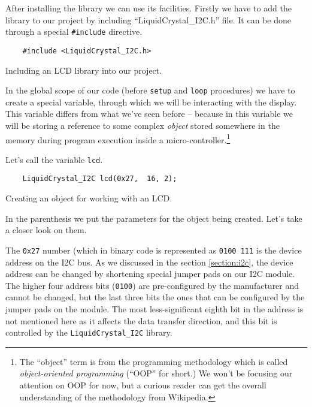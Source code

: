 \documentclass[../sparc.tex]{subfiles}
\begin{document}
After installing the library we can use its facilities.  Firstly we have to add
the library to our project by including ``LiquidCrystal\_I2C.h'' file.  It can
be done through a special \texttt{#include} directive.

\begin{listing}[ht]
  \begin{verbatim}
    #include <LiquidCrystal_I2C.h>
  \end{verbatim}
  \caption{Including an LCD library into our project.}
  \label{listing:game-dev-lcd-include}
\end{listing}

In the global scope of our code (before \texttt{setup} and
\texttt{loop} procedures) we have to create a special variable, through
which we will be interacting with the display.  This variable differs from what
we've seen before -- because in this variable we will be storing a reference to
some complex \emph{object} stored somewhere in the memory during program
execution inside a micro-controller.\footnote{The ``object'' term is from the
programming methodology which is called \emph{object-oriented programming}
(``OOP'' for short.)  We won't be focusing our attention on OOP for now, but a
curious reader can get the overall understanding of the methodology from
Wikipedia.}

Let's call the variable \texttt{lcd}.

\begin{listing}[ht]
  \begin{verbatim}
    LiquidCrystal_I2C lcd(0x27,  16, 2);
  \end{verbatim}
  \caption{Creating an object for working with an LCD.}
  \label{listing:game-dev-lcd-object}
\end{listing}

In the parenthesis we put the parameters for the object being created.  Let's
take a closer look on them.

The \texttt{0x27} number (which in binary code is represented as
\texttt{0100 111} is the device address on the \gls{I2C} bus.  As we
discussed in the section \ref{section:i2c}, the device address can be changed by
shortening special jumper pads on our I2C module.  The higher four address bits
(\texttt{0100}) are pre-configured by the manufacturer and cannot be
changed, but the last three bits the ones that can be configured by the jumper
pads on the module.  The most less-significant eighth bit in the address is not
mentioned here as it affects the data transfer direction, and this bit is
controlled by the \texttt{LiquidCrystal_I2C} library.
\end{document}
